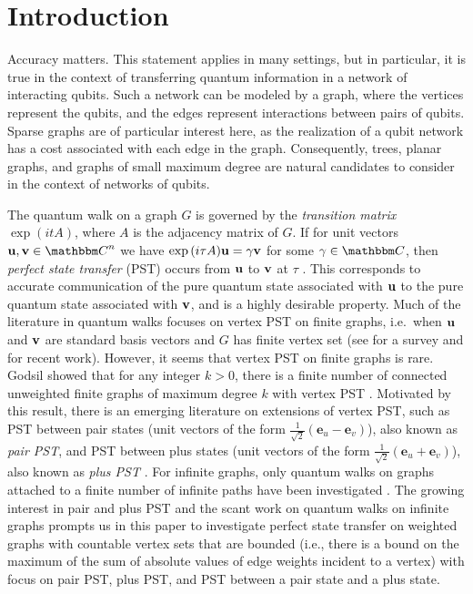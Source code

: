\documentclass[12pt,a4paper]{article}
\def \Cl {{\mathbbm C}}
\def \e {{\bf e}}
\def \u {{\bf u}}
\def \v {{\bf v}}
\def \e {{\mathbf e}}
\begin{document}
  \section{Introduction}

Accuracy matters. This statement applies in many settings,  but in particular, it is true in the context of transferring quantum information in a network of interacting qubits. Such a network can be modeled by a graph, where the vertices represent the qubits, and the edges represent interactions between pairs of qubits. Sparse graphs are of particular interest here, as the realization of a qubit network has a cost associated with each edge in the graph. Consequently, trees, planar graphs, and graphs of small maximum degree are natural candidates to consider in the context of networks of qubits. 

The quantum walk on a graph $G$ is governed by the \textit{transition matrix} $\exp{(itA)}$, where $A$ is the adjacency matrix of $G$. If for unit vectors $\u,\v\in\Cl^n$ we have $\exp{(i\tau A)}\u = \gamma \v$ for some $\gamma\in\Cl$, then \textit{perfect state transfer} (PST) occurs from $\u$ to $\v$ at $\tau$ \cite{godsil2025perfect}. This corresponds to accurate communication of the pure quantum state associated with $\u$ to the pure quantum state associated with $\v$, and is a highly desirable property. Much of the literature in quantum walks focuses on vertex PST on finite graphs, i.e.\ when $\u$ and $\v$ are standard basis vectors and $G$ has finite vertex set (see \cite{god1} for a survey and \cite{pal9,cou7,kirkland2023quantum,kirk2,monterde2025laplacian,pal25} for recent work). However, it seems that vertex PST on finite graphs is rare. Godsil showed that for any integer $k>0$, there is a finite number of connected unweighted finite graphs of maximum degree $k$ with vertex PST \cite[Corollary 6.2]{god2}. Motivated by this result, there is an emerging literature on extensions of vertex PST, such as PST between pair states (unit vectors of the form $\frac{1}{\sqrt{2}}(\e_u-\e_v)$), also known as \textit{pair PST}, and PST between plus states (unit vectors of the form $\frac{1}{\sqrt{2}}(\e_u+\e_v)$), also known as \textit{plus PST} \cite{che1,kim,ojha25,pal10}. %
For infinite graphs, only quantum walks on graphs attached to a finite number of infinite paths have been investigated \cite{bernard2025quantum,childs2009universal,childs2013universal,farhi2007quantum}. The growing interest in pair and plus PST and the scant work on quantum walks on infinite graphs prompts us in this paper to investigate perfect state transfer on weighted graphs with countable vertex sets that are bounded (i.e., there is a bound on the maximum of the sum of absolute values of edge weights incident to a vertex) with focus on pair PST, plus PST, and PST between a pair state and a plus state. 
\end{document}
